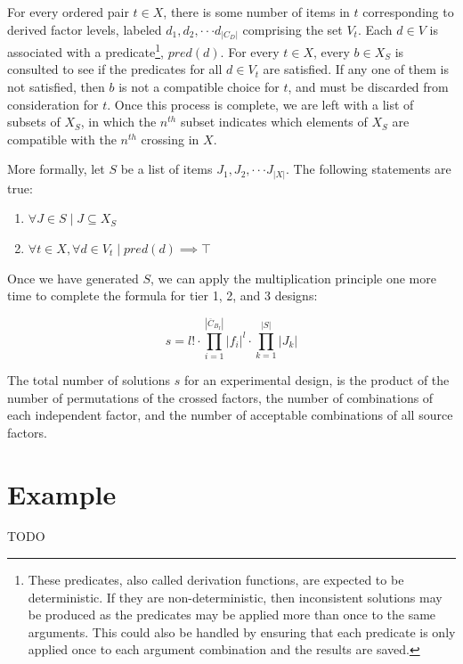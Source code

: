 For every ordered pair $t \in X$, there is some number of items in $t$ corresponding to derived factor levels, labeled $d_1, d_2, \cdot\cdot\cdot d_{|C_D|}$ comprising the set $V_t$. Each $d \in V$ is associated with a predicate\footnote{These predicates, also called derivation functions, are expected to be deterministic. If they are non-deterministic, then inconsistent solutions may be produced as the predicates may be applied more than once to the same arguments. This could also be handled by ensuring that each predicate is only applied once to each argument combination and the results are saved.}, $pred(d)$. For every $t \in X$, every $b \in X_S$ is consulted to see if the predicates for all $d \in V_t$ are satisfied. If any one of them is not satisfied, then $b$ is not a compatible choice for $t$, and must be discarded from consideration for $t$. Once this process is complete, we are left with a list of subsets of $X_S$, in which the $n^{th}$ subset indicates which elements of $X_S$ are compatible with the $n^{th}$ crossing in $X$.

More formally, let $S$ be a list of items $J_1, J_2, \cdot\cdot\cdot J_{|X|}$. The following statements are true:

\begin{enumerate}
\item $\forall J \in S \mid J \subseteq X_S$
\item $\forall t \in X,  \forall d \in V_t \mid pred(d) \implies \top$
\end{enumerate}

Once we have generated $S$, we can apply the multiplication principle one more time to complete the formula for tier 1, 2, and 3 designs:

\[
s = l! \cdot \prod_{i=1}^{|\overline{C}_{B_I}|} |f_i|^l \cdot \prod_{k=1}^{|S|} |J_k|
\]

The total number of solutions $s$ for an experimental design, is the product of the number of permutations of the crossed factors, the number of combinations of each independent factor, and the number of acceptable combinations of all source factors.


\section{Example}

TODO


